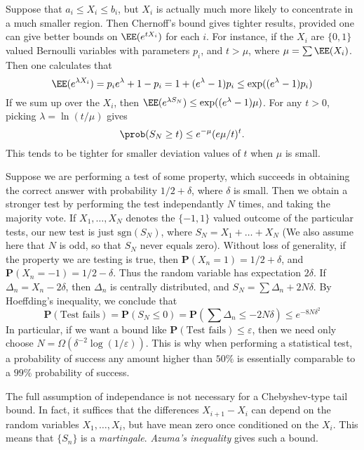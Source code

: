 Suppose that $a_i \leq X_i \leq b_i$, but $X_i$ is actually much more likely to concentrate in a much smaller region. Then Chernoff's bound gives tighter results, provided one can give better bounds on $\EE(e^{t X_i})$ for each $i$. For instance, if the $X_i$ are $\{ 0, 1 \}$ valued Bernoulli variables with parameters $p_i$, and $t > \mu$, where $\mu = \sum \EE(X_i)$. Then one calculates that
%
\[ \EE(e^{\lambda X_i}) = p_i e^\lambda + 1 - p_i = 1 + (e^\lambda - 1) p_i \leq \exp( (e^\lambda - 1) p_i ) \]
%
If we sum up over the $X_i$, then $\EE(e^{\lambda S_N}) \leq \exp( (e^\lambda - 1) \mu )$. For any $t > 0$, picking $\lambda = \ln(t/\mu)$ gives
%
\[ \prob(S_N \geq t) \leq e^{-\mu} (e \mu/t)^t.  \]
%
This tends to be tighter for smaller deviation values of $t$ when $\mu$ is small.

\begin{example}
    Suppose we are performing a test of some property, which succeeds in obtaining the correct answer with probability $1/2 + \delta$, where $\delta$ is small. Then we obtain a stronger test by performing the test independantly $N$ times, and taking the majority vote. If $X_1,\dots, X_N$ denotes the $\{ -1,1 \}$ valued outcome of the particular tests, our new test is just $\text{sgn}(S_N)$, where $S_N = X_1 + \dots + X_N$ (We also assume here that $N$ is odd, so that $S_N$ never equals zero). Without loss of generality, if the property we are testing is true, then $\mathbf{P}(X_n = 1) = 1/2 + \delta$, and $\mathbf{P}(X_n = -1) = 1/2 - \delta$. Thus the random variable has expectation $2\delta$. If $\Delta_n = X_n - 2\delta$, then $\Delta_n$ is centrally distributed, and $S_N = \sum \Delta_n + 2N \delta$. By Hoeffding's inequality, we conclude that
    \[ \mathbf{P}(\text{Test fails}) = \mathbf{P} \left( S_N \leq 0 \right) = \mathbf{P} \left( \sum \Delta_n \leq -2N\delta \right) \leq e^{-8N \delta^2} \]
    In particular, if we want a bound like $\mathbf{P}(\text{Test fails}) \leq \varepsilon$, then we need only choose $N = \Omega(\delta^{-2} \log(1/\varepsilon))$. This is why when performing a statistical test, a probability of success any amount higher than $50 \%$ is essentially comparable to a $99\%$ probability of success.
\end{example}

The full assumption of independance is not necessary for a Chebyshev-type tail bound. In fact, it suffices that the differences $X_{i+1} - X_i$ can depend on the random variables $X_1, \dots, X_i$, but have mean zero once conditioned on the $X_i$. This means that $\{ S_n \}$ is a {\it martingale}. {\it Azuma's inequality} gives such a bound.

